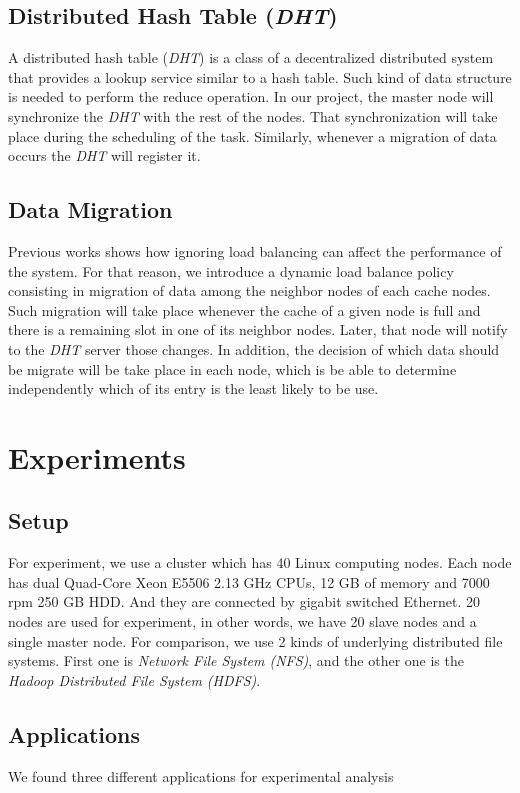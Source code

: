 \subsection*{Distributed Hash Table (\textit{DHT})}
A distributed hash table (\textit{DHT}) is a class of a decentralized distributed system that provides
a lookup service similar to a hash table. Such kind of data structure is needed to perform
the reduce operation. In our project, the master node will synchronize the \textit{DHT} with the rest
of the nodes. That synchronization will take place during the scheduling of the task. Similarly,
whenever a migration of data occurs the \textit{DHT} will register it. 

\subsection*{Data Migration}
Previous works shows how ignoring load balancing can affect the performance of the system.
For that reason, we introduce a dynamic load balance policy consisting in migration of data among
the neighbor nodes of each cache nodes. Such migration will take place whenever the cache of a given node is full 
and there is a remaining slot in one of its neighbor nodes. Later, that node will notify to the \textit{DHT} server 
those changes. In addition, the decision of which data should be migrate will be take place in each node,
which is be able to determine independently which of its entry is the least likely to be use.

\section*{Experiments}
\subsection*{Setup}
For experiment, we use a cluster which has 40 Linux computing nodes. Each node has dual Quad-Core Xeon E5506 2.13 GHz CPUs,
12 GB of memory and 7000 rpm 250 GB HDD. And they are connected by gigabit switched Ethernet. 
20 nodes are used for experiment, in other words, we have 20 slave nodes and a single master node.
For comparison, we use 2 kinds of underlying distributed file systems. First one is \textit{Network File System (NFS)}, 
and the other one is the \textit{Hadoop Distributed File System (HDFS)}.

\subsection*{Applications}
We found three different applications for experimental analysis

